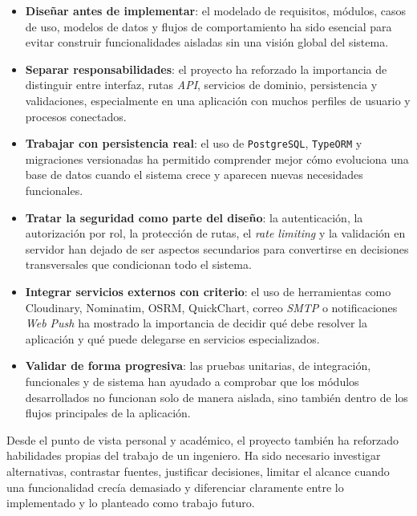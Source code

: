 \begin{itemize}
    \item \textbf{Diseñar antes de implementar}: el modelado de requisitos, módulos, casos de uso, modelos de datos y flujos de comportamiento ha sido esencial para evitar construir funcionalidades aisladas sin una visión global del sistema.

    \item \textbf{Separar responsabilidades}: el proyecto ha reforzado la importancia de distinguir entre interfaz, rutas \textit{API}, servicios de dominio, persistencia y validaciones, especialmente en una aplicación con muchos perfiles de usuario y procesos conectados.

    \item \textbf{Trabajar con persistencia real}: el uso de \texttt{PostgreSQL}, \texttt{TypeORM} y migraciones versionadas ha permitido comprender mejor cómo evoluciona una base de datos cuando el sistema crece y aparecen nuevas necesidades funcionales.

    \item \textbf{Tratar la seguridad como parte del diseño}: la autenticación, la autorización por rol, la protección de rutas, el \textit{rate limiting} y la validación en servidor han dejado de ser aspectos secundarios para convertirse en decisiones transversales que condicionan todo el sistema.

    \item \textbf{Integrar servicios externos con criterio}: el uso de herramientas como Cloudinary, Nominatim, OSRM, QuickChart, correo \textit{SMTP} o notificaciones \textit{Web Push} ha mostrado la importancia de decidir qué debe resolver la aplicación y qué puede delegarse en servicios especializados.

    \item \textbf{Validar de forma progresiva}: las pruebas unitarias, de integración, funcionales y de sistema han ayudado a comprobar que los módulos desarrollados no funcionan solo de manera aislada, sino también dentro de los flujos principales de la aplicación.
\end{itemize}

Desde el punto de vista personal y académico, el proyecto también ha reforzado habilidades propias del trabajo de un ingeniero. Ha sido necesario investigar alternativas, contrastar fuentes, justificar decisiones, limitar el alcance cuando una funcionalidad crecía demasiado y diferenciar claramente entre lo implementado y lo planteado como trabajo futuro.

